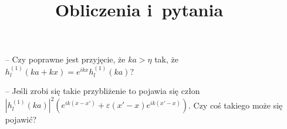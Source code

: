 \documentclass[a4paper,11pt]{article}
\title{Obliczenia i~pytania}
\author{}
\newcommand{\de}{\mathrm{d}}
\begin{document}
\noindent
\begin{itemize}
\item[--] Czy poprawne jest przyjęcie, że $ka > \eta$ tak, że $h^{ ( 1 ) }_{ l }( ka + k x ) = e^{ i kx } h^{ ( 1 ) }_{ l }( ka )$?
\item[--] Jeśli zrobi się takie przybliżenie to pojawia się człon $| h_{ l }^{ ( 1 ) }( k a ) |^{ 2 } ( e^{ i k ( x - x' ) } + \varepsilon( x' - x ) e^{ i k ( x' - x ) } )$. Czy coś takiego może się pojawić?
\end{itemize}

%
\end{document}
